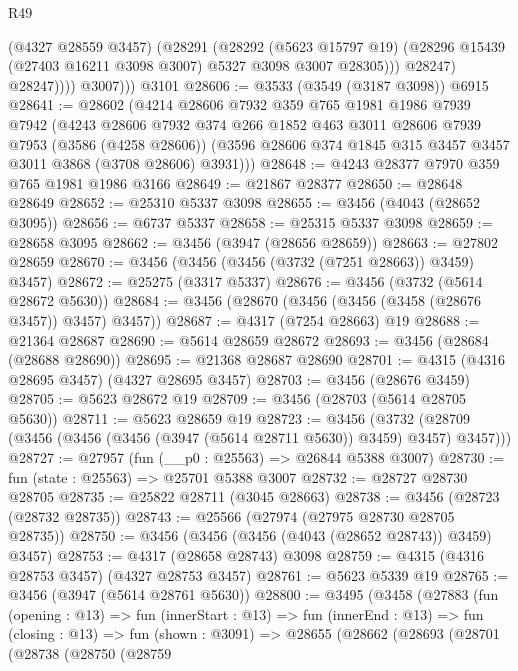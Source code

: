 \begin{lexlean}{R49}
\begin{coremodule}
                  (@4327 @28559 @3457)
                  (@28291
                    (@28292
                      (@5623 @15797 @19)
                      (@28296 @15439 (@27403 @16211 @3098 @3007) @5327 @3098 @3007 @28305)))
                  @28247)
                @28247))))
          @3007)))
    @3101
@28606 := @3533 (@3549 (@3187 @3098)) @6915
@28641 := @28602
    (@4214
      @28606
      @7932
      @359
      @765
      @1981
      @1986
      @7939
      @7942
      (@4243
        @28606
        @7932
        @374
        @266
        @1852
        @463
        @3011
        @28606
        @7939
        @7953
        (@3586 (@4258 @28606))
        (@3596 @28606 @374 @1845 @315 @3457 @3457 @3011 @3868 (@3708 @28606) @3931)))
@28648 := @4243 @28377 @7970 @359 @765 @1981 @1986 @3166
@28649 := @21867 @28377
@28650 := @28648 @28649
@28652 := @25310 @5337 @3098
@28655 := @3456 (@4043 (@28652 @3095))
@28656 := @6737 @5337
@28658 := @25315 @5337 @3098
@28659 := @28658 @3095
@28662 := @3456 (@3947 (@28656 @28659))
@28663 := @27802 @28659
@28670 := @3456 (@3456 (@3456 (@3732 (@7251 @28663)) @3459) @3457)
@28672 := @25275 (@3317 @5337)
@28676 := @3456 (@3732 (@5614 @28672 @5630))
@28684 := @3456 (@28670 (@3456 (@3456 (@3458 (@28676 @3457)) @3457) @3457))
@28687 := @4317 (@7254 @28663) @19
@28688 := @21364 @28687
@28690 := @5614 @28659 @28672
@28693 := @3456 (@28684 (@28688 @28690))
@28695 := @21368 @28687 @28690
@28701 := @4315 (@4316 @28695 @3457) (@4327 @28695 @3457)
@28703 := @3456 (@28676 @3459)
@28705 := @5623 @28672 @19
@28709 := @3456 (@28703 (@5614 @28705 @5630))
@28711 := @5623 @28659 @19
@28723 := @3456
    (@3732 (@28709 (@3456 (@3456 (@3456 (@3947 (@5614 @28711 @5630)) @3459) @3457) @3457)))
@28727 := @27957 (fun (__p0 : @25563) => @26844 @5388 @3007)
@28730 := fun (state : @25563) => @25701 @5388 @3007
@28732 := @28727 @28730 @28705
@28735 := @25822 @28711 (@3045 @28663)
@28738 := @3456 (@28723 (@28732 @28735))
@28743 := @25566 (@27974 (@27975 @28730 @28705 @28735))
@28750 := @3456 (@3456 (@3456 (@4043 (@28652 @28743)) @3459) @3457)
@28753 := @4317 (@28658 @28743) @3098
@28759 := @4315 (@4316 @28753 @3457) (@4327 @28753 @3457)
@28761 := @5623 @5339 @19
@28765 := @3456 (@3947 (@5614 @28761 @5630))
@28800 := @3495
    (@3458
      (@27883
        (fun (opening : @13) =>
        fun (innerStart : @13) =>
        fun (innerEnd : @13) =>
        fun (closing : @13) =>
        fun (shown : @3091) =>
        @28655
          (@28662
            (@28693
              (@28701
                (@28738
                  (@28750
                    (@28759

\end{coremodule}
\end{lexlean}
